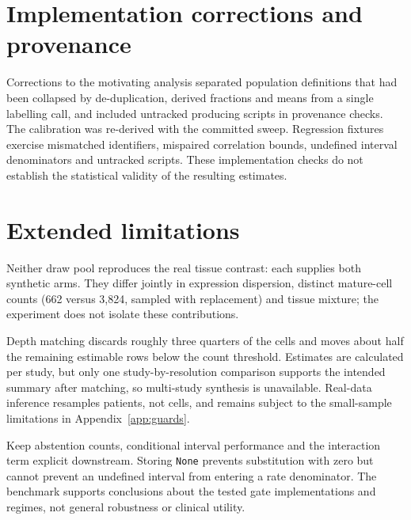 \section{Implementation corrections and provenance}
\label{app:withdrawn}
Corrections to the motivating analysis separated population definitions that
had been collapsed by de-duplication, derived fractions and means from a single
labelling call, and included untracked producing scripts in provenance checks.
The calibration was re-derived with the committed sweep. Regression fixtures
exercise mismatched identifiers, mispaired correlation bounds, undefined
interval denominators and untracked scripts. These implementation checks do
not establish the statistical validity of the resulting estimates.

\section{Extended limitations}
\label{app:limitations}
Neither draw pool reproduces the real tissue contrast: each supplies both
synthetic arms. They differ jointly in expression dispersion, distinct
mature-cell counts (662 versus 3{,}824, sampled with replacement) and tissue
mixture; the experiment does not isolate these contributions.

Depth matching discards roughly three quarters of the cells and moves about
half the remaining estimable rows below the count threshold. Estimates are
calculated per study, but only one study-by-resolution comparison supports the
intended summary after matching, so multi-study synthesis is unavailable.
Real-data inference resamples patients, not cells, and remains subject to the
small-sample limitations in Appendix~\ref{app:guards}.

Keep abstention counts, conditional interval performance and the interaction
term explicit downstream. Storing \texttt{None} prevents substitution with zero
but cannot prevent an undefined interval from entering a rate denominator.
The benchmark supports conclusions about the tested gate implementations and
regimes, not general robustness or clinical utility.
